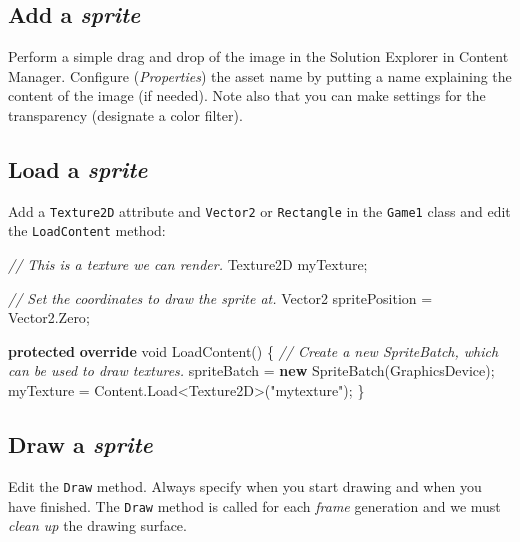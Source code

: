 \documentclass[11pt, a4paper]{article}
\newenvironment{Shaded}{}{}
\newcommand{\KeywordTok}[1]{\textcolor[rgb]{0.00,0.44,0.13}{\textbf{{#1}}}}
\newcommand{\DataTypeTok}[1]{\textcolor[rgb]{0.56,0.13,0.00}{{#1}}}
\newcommand{\StringTok}[1]{\textcolor[rgb]{0.25,0.44,0.63}{{#1}}}
\newcommand{\CommentTok}[1]{\textcolor[rgb]{0.38,0.63,0.69}{\textit{{#1}}}}
\newcommand{\FunctionTok}[1]{\textcolor[rgb]{0.02,0.16,0.49}{{#1}}}
\newcommand{\NormalTok}[1]{{#1}}
\begin{document}
\subsection{Add a \emph{sprite}}\label{add-a-sprite}

Perform a simple drag and drop of the image in the Solution Explorer in
Content Manager. Configure (\emph{Properties}) the asset name by putting
a name explaining the content of the image (if needed). Note also that
you can make settings for the transparency (designate a color filter).

\subsection{Load a \emph{sprite}}\label{load-a-sprite}

Add a \texttt{Texture2D} attribute and \texttt{Vector2} or
\texttt{Rectangle} in the \texttt{Game1} class and edit the
\texttt{LoadContent} method:

\begin{Shaded}
\begin{Highlighting}[]
\CommentTok{// This is a texture we can render.}
\NormalTok{Texture2D myTexture;}

\CommentTok{// Set the coordinates to draw the sprite at.}
\NormalTok{Vector2 spritePosition = Vector2.}\FunctionTok{Zero}\NormalTok{;}

\KeywordTok{protected} \KeywordTok{override} \DataTypeTok{void} \FunctionTok{LoadContent}\NormalTok{()}
\NormalTok{\{}
    \CommentTok{// Create a new SpriteBatch, which can be used to draw textures.}
    \NormalTok{spriteBatch = }\KeywordTok{new} \FunctionTok{SpriteBatch}\NormalTok{(GraphicsDevice);}
    \NormalTok{myTexture = Content.}\FunctionTok{Load}\NormalTok{<Texture2D>(}\StringTok{"mytexture"}\NormalTok{);}
\NormalTok{\}}
\end{Highlighting}
\end{Shaded}

\subsection{Draw a \emph{sprite}}\label{draw-a-sprite}

Edit the \texttt{Draw} method. Always specify when you start drawing and
when you have finished. The \texttt{Draw} method is called for each
\emph{frame} generation and we must \emph{clean up} the drawing surface.
\end{document}
